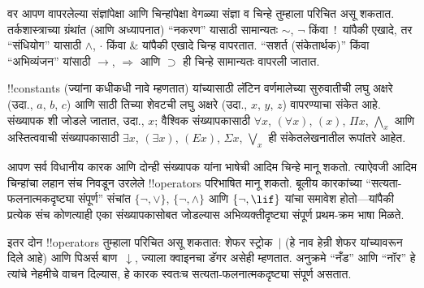\documentclass[../../../include/open-logic-section]{subfiles}
\begin{document}

\begin{intro}
वर आपण वापरलेल्या संज्ञांपेक्षा आणि चिन्हांपेक्षा वेगळ्या संज्ञा व
चिन्हे तुम्हाला परिचित असू शकतात. तर्कशास्त्राच्या ग्रंथांत (आणि
अध्यापनात) ``नकरण'' यासाठी सामान्यतः $\sim$, $\neg$ किंवा~!\ यांपैकी
एखादे, तर ``संधियोग'' यासाठी $\wedge$, $\cdot$ किंवा $\&$ यांपैकी
एखादे चिन्ह वापरतात. ``सशर्त (संकेतार्थक)'' किंवा ``अभिव्यंजन'' यांसाठी
$\rightarrow$, $\Rightarrow$ आणि $\supset$ ही चिन्हे सामान्यतः वापरली जातात.

!!{constant}s (ज्यांना कधीकधी नावे म्हणतात) यांच्यासाठी लॅटिन
वर्णमालेच्या सुरुवातीची लघु अक्षरे (उदा., $a$, $b$, $c$) आणि
साठी तिच्या शेवटची लघु अक्षरे (उदा., $x$, $y$, $z$)
वापरण्याचा संकेत आहे. संख्यापक शी जोडले जातात, उदा.,
$x$; वैश्विक संख्यापकासाठी $\forall x$, $(\forall x)$, $(x)$, $\Pi x$,
$\bigwedge_x$ आणि अस्तित्ववाची संख्यापकासाठी $\exists x$, $(\exists
x)$, $(Ex)$, $\Sigma x$, $\bigvee_x$ ही संकेतलेखनातील रूपांतरे आहेत.
\end{intro}

\begin{explain}
आपण सर्व विधानीय कारक आणि दोन्ही संख्यापक यांना भाषेची आदिम चिन्हे
मानू शकतो. त्याऐवजी आदिम चिन्हांचा लहान संच निवडून उरलेले
!!{operator}s परिभाषित मानू शकतो. बूलीय कारकांच्या
``सत्यता-फलनात्मकदृष्ट्या संपूर्ण'' संचांत $\{ \lnot, \lor \}$,
$\{ \lnot, \land \}$ आणि $\{ \lnot,
\lif\}$ यांचा समावेश होतो---यांपैकी प्रत्येक संच कोणत्याही एका
संख्यापकासोबत जोडल्यास अभिव्यक्तीदृष्ट्या संपूर्ण प्रथम-क्रम भाषा मिळते.

इतर दोन !!{operator}s तुम्हाला परिचित असू शकतात: शेफर स्ट्रोक~$|$
(हे नाव हेन्री शेफर यांच्यावरून दिले आहे) आणि पिअर्स बाण~$\downarrow$,
ज्याला क्वाइनचा डॅगर असेही म्हणतात. अनुक्रमे ``नँड'' आणि ``नॉर'' हे
त्यांचे नेहमीचे वाचन दिल्यास, हे कारक स्वतःच सत्यता-फलनात्मकदृष्ट्या
संपूर्ण असतात.
\end{explain}
\end{document}
